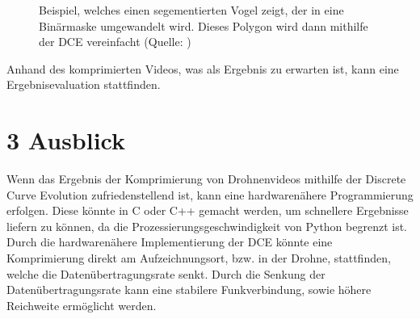 \documentclass[a4paper,11pt,pdftex, parskip]{scrreprt}
\begin{document}
{\begin{figure}[ht]
    \caption[Beispiel aus \citep{Dorr2017}]{Beispiel, welches einen segementierten Vogel zeigt, der in eine Binärmaske umgewandelt wird. Dieses Polygon wird dann mithilfe der DCE vereinfacht (Quelle: \citep{Dorr2017})}
    \label{Bsp_Dorr}
\end{figure}
\newline
Anhand des komprimierten Videos, was als Ergebnis zu erwarten ist, kann eine Ergebnisevaluation stattfinden.
}


    
    






\section*{3 Ausblick}
Wenn das Ergebnis der Komprimierung von Drohnenvideos mithilfe der Discrete Curve Evolution zufriedenstellend ist, kann eine hardwarenähere Programmierung erfolgen. Diese könnte in C oder C++ gemacht werden, um schnellere Ergebnisse liefern zu können, da die Prozessierungsgeschwindigkeit von Python begrenzt ist.\newline
Durch die hardwarenähere Implementierung der DCE könnte eine Komprimierung direkt am Aufzeichnungsort, bzw. in der Drohne, stattfinden, welche die Datenübertragungsrate senkt. Durch die Senkung der Datenübertragungsrate kann eine stabilere Funkverbindung, sowie höhere Reichweite ermöglicht werden.



\appendix




\setcounter{page}{1}
\listoffigures
\end{document}
